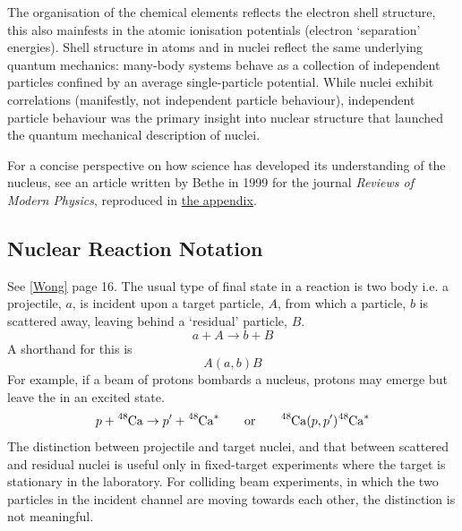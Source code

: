 The organisation of the chemical elements reflects the electron shell structure, this also mainfests in the atomic ionisation potentials (electron `separation' energies). Shell structure in atoms and in nuclei reflect the same underlying quantum mechanics: many-body systems behave as a collection of independent particles confined by an average single-particle potential. While nuclei exhibit correlations (manifestly, not independent particle behaviour), independent particle behaviour was the primary insight into nuclear structure that launched the quantum mechanical description of nuclei.

For a concise perspective on how science has developed its understanding of the nucleus, see an article written by Bethe in 1999 for the journal \textit{Reviews of Modern Physics}, reproduced in \hyperref[bethe]{the appendix}.



\subsection{Nuclear Reaction Notation}
See \ref{Wong} page 16. The usual type of final state in a reaction is two body i.e. a projectile, \(a\), is incident upon a target particle, \(A\), from which a particle, \(b\) is scattered away, leaving behind a `residual' particle, \(B\).
\[a+A \rightarrow b+B\]
A shorthand for this is 
\[A(a,b)B\]
For example, if a beam of protons bombards a  nucleus, protons may emerge but leave the  in an excited state.
\[p+\ce{^{48}Ca} \rightarrow p' +\ce{^{48}Ca^*} \quad\quad\text{or}\quad\quad \ce{^{48}Ca}(p,p')\ce{^{48}Ca^*}\]
The distinction between projectile and target nuclei, and that between scattered and residual nuclei is useful only in fixed-target experiments where the target is stationary in the laboratory. For colliding beam experiments, in which the two particles in the incident channel are moving towards each other, the distinction is not meaningful. 
